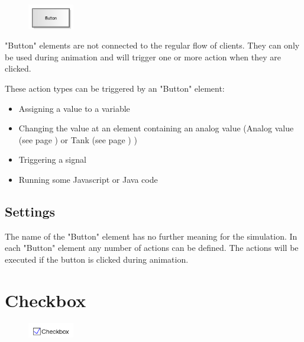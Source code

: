 \begin{figure}
\vspace{-22pt}
\includegraphics[width=2cm]{imageModelElementInteractiveButton.png}
\vspace{-22pt}
\end{figure}

"Button" elements are not connected to the regular flow of clients.
They can only be used during animation and will trigger one or more
action when they are clicked.

These action types can be triggered by an "Button" element:

\begin{itemize}
  \item Assigning a value to a variable 
  \item Changing the value at an element containing an analog value
  (Analog value (see page \pageref{ref:ModelElementAnalogValue}) or Tank (see page \pageref{ref:ModelElementTank}) )
  \item Triggering a signal 
  \item Running some Javascript or Java code 
\end{itemize}

\subsection*{Settings}

The name of the "Button" element has no further meaning for the simulation.
In each "Button" element any number of actions can be defined. The actions will
be executed if the button is clicked during animation.


\section{Checkbox}
\label{ref:ModelElementInteractiveCheckbox}

\begin{figure}
\vspace{-22pt}
\includegraphics[width=2cm]{imageModelElementInteractiveCheckbox.png}
\vspace{-22pt}
\end{figure}


